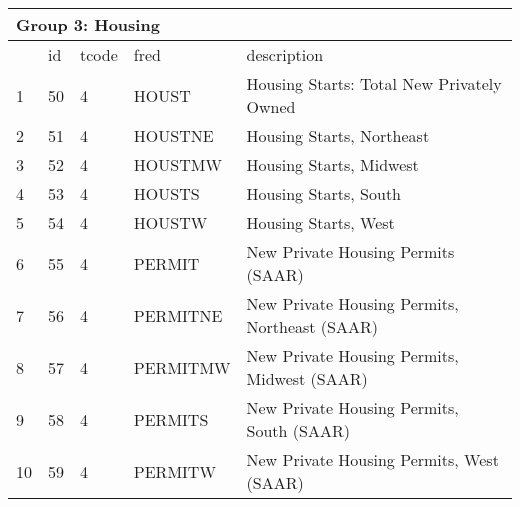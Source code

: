 \begin{table}[ht] 
\centering 
\begin{tabular}{lllll}
\multicolumn{5}{l}{Group 3: Housing} \\
\toprule
 & id & tcode & fred & description \\
\midrule
1 & 50 & 4 & HOUST & Housing Starts: Total New Privately Owned \\
2 & 51 & 4 & HOUSTNE & Housing Starts, Northeast \\
3 & 52 & 4 & HOUSTMW & Housing Starts, Midwest \\
4 & 53 & 4 & HOUSTS & Housing Starts, South \\
5 & 54 & 4 & HOUSTW & Housing Starts, West \\
6 & 55 & 4 & PERMIT & New Private Housing Permits (SAAR) \\
7 & 56 & 4 & PERMITNE & New Private Housing Permits, Northeast (SAAR) \\
8 & 57 & 4 & PERMITMW & New Private Housing Permits, Midwest (SAAR) \\
9 & 58 & 4 & PERMITS & New Private Housing Permits, South (SAAR) \\
10 & 59 & 4 & PERMITW & New Private Housing Permits, West (SAAR) \\
\bottomrule
\end{tabular}  
\end{table} 